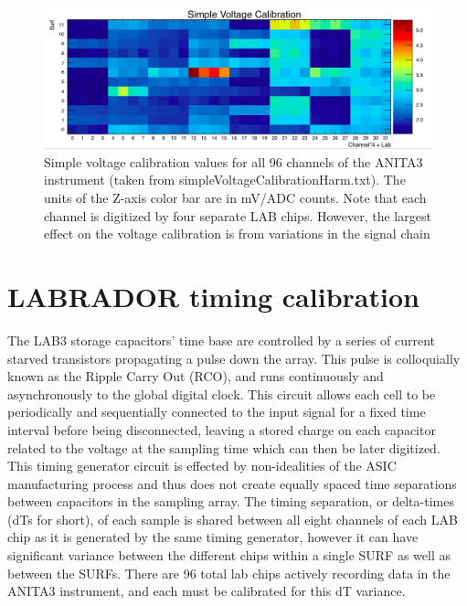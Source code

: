 			
	\begin{figure}
		\centering
		\includegraphics[width=\textwidth]{figures/ADCtoVolts.png}
		\caption{Simple voltage calibration values for all 96 channels of the ANITA3 instrument (taken from simpleVoltageCalibrationHarm.txt).  The units of the Z-axis color bar are in mV/ADC counts.  Note that each channel is digitized by four separate LAB chips.  However, the largest effect on the voltage calibration is from variations in the signal chain}
		\label{fig:adcTomV}
	\end{figure}
		



\section{LABRADOR timing calibration}
		The LAB3 storage capacitors' time base are controlled by a series of current starved transistors propagating a pulse down the array.  This pulse is colloquially known as the Ripple Carry Out (RCO), and runs continuously and asynchronously to the global digital clock.  This circuit allows each cell to be periodically and sequentially connected to the input signal for a fixed time interval before being disconnected, leaving a stored charge on each capacitor related to the voltage at the sampling time which can then be later digitized.  This timing generator circuit is effected by non-idealities of the ASIC manufacturing process and thus does not create equally spaced time separations between capacitors in the sampling array.  The timing separation, or delta-times (dTs for short), of each sample is shared between all eight channels of each LAB chip as it is generated by the same timing generator, however it can have significant variance between the different chips within a single SURF as well as between the SURFs.  There are 96 total lab chips actively recording data in the ANITA3 instrument, and each must be calibrated for this dT variance.


